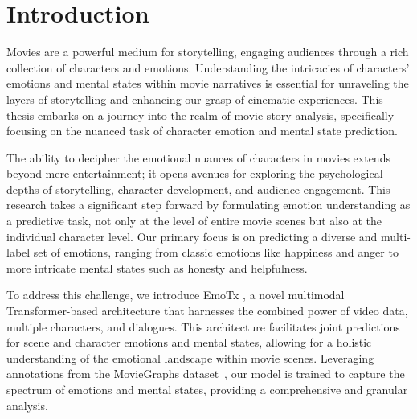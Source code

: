 \chapter{Introduction}
\label{ch:intro}

Movies are a powerful medium for storytelling, engaging audiences through a rich collection of characters and emotions. Understanding the intricacies of characters' emotions and mental states within movie narratives is essential for unraveling the layers of storytelling and enhancing our grasp of cinematic experiences. This thesis embarks on a journey into the realm of movie story analysis, specifically focusing on the nuanced task of character emotion and mental state prediction.

The ability to decipher the emotional nuances of characters in movies extends beyond mere entertainment; it opens avenues for exploring the psychological depths of storytelling, character development, and audience engagement. This research takes a significant step forward by formulating emotion understanding as a predictive task, not only at the level of entire movie scenes but also at the individual character level. Our primary focus is on predicting a diverse and multi-label set of emotions, ranging from classic emotions like happiness and anger to more intricate mental states such as honesty and helpfulness.

To address this challenge, we introduce EmoTx \cite{dhruv2023emotx}, a novel multimodal Transformer-based architecture that harnesses the combined power of video data, multiple characters, and dialogues. This architecture facilitates joint predictions for scene and character emotions and mental states, allowing for a holistic understanding of the emotional landscape within movie scenes. Leveraging annotations from the MovieGraphs dataset~\cite{moviegraphs}, our model is trained to capture the spectrum of emotions and mental states, providing a comprehensive and granular analysis.
